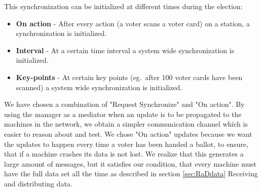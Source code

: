 \documentclass[a4paper]{report}
\begin{document}
\noindent This synchronization can be initialized at different times during the election:
\begin{itemize}

\item \textbf{On action}
- After every action (a voter scans a voter card) on a station, a synchronization is initialized.
\item \textbf{Interval}
- At a certain time interval a system wide synchronization is initialized.
\item \textbf{Key-points}
- At certain key points (eg.\ after 100 voter cards have been scanned) a system wide synchronization is initialized.
\end{itemize}

We have chosen a combination of "Request Synchronize" and "On action". By using the manager as a mediator when an update is to be propagated to the machines in the network, we obtain a simpler communication channel which is easier to reason about and test. We chose "On action" updates because we want the updates to happen every time a voter has been handed a ballot, to ensure, that if a machine crashes its data is not lost. We realize that this generates a large amount of messages, but it satisfies our condition, that every machine must have the full data set all the time as described in section \ref{sec:RaDdata} Receiving and distributing data. \\
\end{document}
